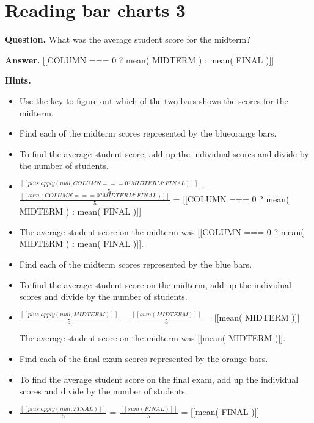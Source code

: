 \documentclass{article}
\begin{document}
\section*{Reading bar charts 3}
\textbf{Question.} What was the average student score for the midterm?

\textbf{Answer.} [[COLUMN === 0 ? mean( MIDTERM ) : mean( FINAL )]]

\textbf{Hints.}
\begin{itemize}
  \item Use the key to figure out which of the two bars shows the scores for the midterm.
  \item Find each of the midterm scores represented by the blueorange bars.
  \item To find the average student score, add up the individual scores and divide by the number of students.
  \item $\frac{[[plus.apply( null, COLUMN === 0 ? MIDTERM : FINAL )]]}{5}$ =
                            $\frac{[[sum( COLUMN === 0 ? MIDTERM :  FINAL )]]}{5}$ =
                            [[COLUMN === 0 ? mean( MIDTERM ) : mean( FINAL )]]
  \item The average student score on the midterm was [[COLUMN === 0 ? mean( MIDTERM ) : mean( FINAL )]].
  \item Find each of the midterm scores represented by the blue bars.
  \item To find the average student score on the midterm, add up the individual scores and divide by the number of students.
  \item $\frac{[[plus.apply( null, MIDTERM )]]}{5}$ =
                            $\frac{[[sum( MIDTERM )]]}{5}$ =
                            [[mean( MIDTERM )]]
                        
                        The average student score on the midterm was [[mean( MIDTERM )]].
  \item Find each of the final exam scores represented by the orange bars.
  \item To find the average student score on the final exam, add up the individual scores and divide by the number of students.
  \item $\frac{[[plus.apply( null, FINAL )]]}{5}$ =
                            $\frac{[[sum( FINAL )]]}{5}$ =
                            [[mean( FINAL )]]
                        

\end{itemize}
\end{document}
